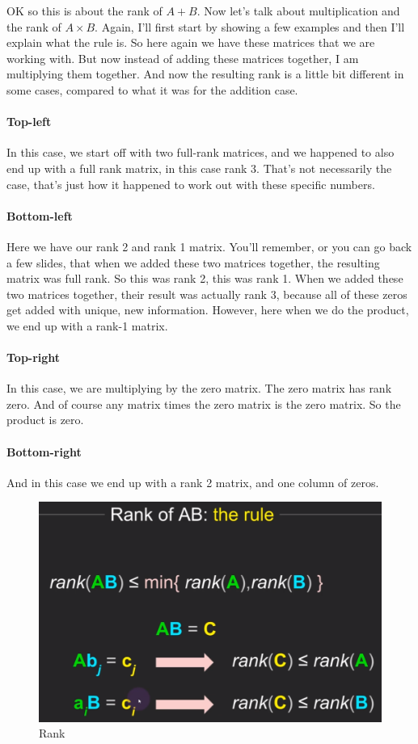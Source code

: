 \documentclass[fleqn,10pt]{olplainarticle}
\theoremstyle{definition}
\theoremstyle{remark}
\begin{document}
OK so this is about the rank of $A + B$. Now let's talk about multiplication and the rank of $A \times B$. Again, I'll first start by showing a few examples and then I'll explain what the rule is. So here again we have these matrices that we are working with. But now instead of adding these matrices together, I am multiplying them together. And now the resulting rank is a little bit different in some cases, compared to what it was for the addition case.

\paragraph{Top-left}

In this case, we start off with two full-rank matrices, and we happened to also end up with a full rank matrix, in this case rank 3. That's not necessarily the case, that's just how it happened to work out with these specific numbers.

\paragraph{Bottom-left}

Here we have our rank 2 and rank 1 matrix. You'll remember, or you can go back a few slides, that when we added these two matrices together, the resulting matrix was full rank. So this was rank 2, this was rank 1. When we added these two matrices together, their result was actually rank 3, because all of these zeros get added with unique, new information. However, here when we do the product, we end up with a rank-1 matrix. 

\paragraph{Top-right}

In this case, we are multiplying by the zero matrix. The zero matrix has rank zero. And of course any matrix times the zero matrix is the zero matrix. So the product is zero. 

\paragraph{Bottom-right}

And in this case we end up with a rank 2 matrix, and one column of zeros.

\begin{figure}[ht]
	\centering
	\includegraphics[width=0.5\linewidth]{images/rank-21.png}
	\caption{Rank}
	\label{fig:rank_21}
\end{figure}
\end{document}
